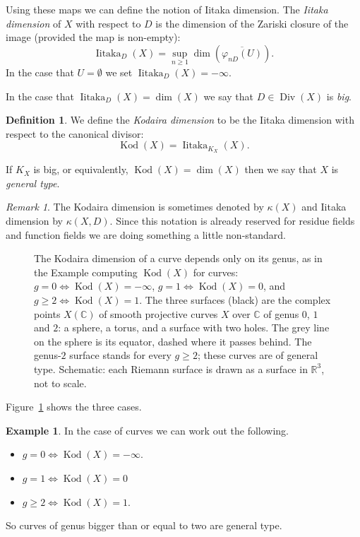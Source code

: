 \documentclass[12pt]{article}
\numberwithin{equation}{section}
\theoremstyle{definition}
\newtheorem{definition}[theorem]{Definition}
\newtheorem{example}[theorem]{Example}
\theoremstyle{remark}
\newtheorem{remark}[theorem]{Remark}
\newcommand{\RR}{\mathbb{R}}
\newcommand{\CC}{\mathbb{C}}
\newcommand{\Div}{\operatorname{Div}}
\newcommand{\kod}{\operatorname{Kod}}
\newcommand{\iitaka}{\operatorname{Iitaka}}
\begin{document}
Using these maps we can define the notion of Iitaka dimension.
The \emph{Iitaka dimension} of $X$ with respect to $D$ is the dimension of the Zariski closure of the image (provided the map is non-empty):
$$\iitaka_D(X) = \sup_{n\geq 1} \dim( \overline{\varphi_{nD}(U)} ). $$
In the case that $U = \emptyset$ we set $\iitaka_D(X) = -\infty$.

In the case that $\iitaka_D(X)=\dim(X)$ we say that $D\in \Div(X)$ is \emph{big}.

\begin{definition}
	We define the \emph{Kodaira dimension} to be the Iitaka dimension with respect to the canonical divisor:
	 $$ \kod(X) = \iitaka_{K_X}(X).$$
\end{definition}

If $K_X$ is big, or equivalently, $\kod(X)=\dim(X)$ then we say that $X$ is \emph{general type}.

\begin{remark}
	The Kodaira dimension is sometimes denoted by $\kappa(X)$ and Iitaka dimension by $\kappa(X,D)$. 
	Since this notation is already reserved for residue fields and function fields we are doing something a little non-standard.
\end{remark}


\begin{figure}[H]
\centering

\caption{The Kodaira dimension of a curve depends only on its genus, as in the Example computing $\kod(X)$ for curves: $g=0\iff\kod(X)=-\infty$, $g=1\iff\kod(X)=0$, and $g\geq2\iff\kod(X)=1$. The three surfaces (black) are the complex points $X(\CC)$ of smooth projective curves $X$ over $\CC$ of genus $0$, $1$ and $2$: a sphere, a torus, and a surface with two holes. The grey line on the sphere is its equator, dashed where it passes behind. The genus-$2$ surface stands for every $g\geq2$; these curves are of general type. Schematic: each Riemann surface is drawn as a surface in $\RR^3$, not to scale.}\label{fig:kodaira-curves}
\end{figure}
Figure~\ref{fig:kodaira-curves} shows the three cases.

\begin{example}
	In the case of curves we can work out the following.
	\begin{itemize}
		\item $g=0 \iff \kod(X)=-\infty$.
		\item $g=1 \iff \kod(X)=0$
		\item $g\geq 2 \iff \kod(X) =1$.
	\end{itemize}
So curves of genus bigger than or equal to two are general type. 
\end{example}
\end{document}
